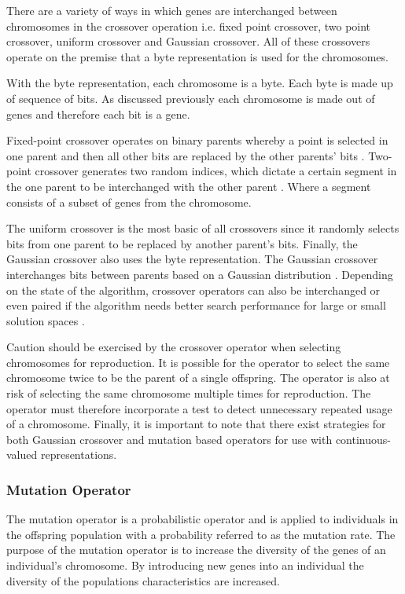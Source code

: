 There are a variety of ways in which genes are interchanged between chromosomes in the crossover operation i.e. fixed point crossover, two point crossover, uniform crossover and Gaussian crossover\cite{CompuIntelligenceIntro}. All of these crossovers operate on the premise that a byte representation is used for the chromosomes. 

With the byte representation, each chromosome is a byte. Each byte is made up of sequence of bits. As discussed previously each chromosome is made out of genes and therefore each bit is a gene\cite{CompuIntelligenceIntro}.

Fixed-point crossover operates on binary parents whereby a point is selected in one parent and then all other bits are replaced by the other parents' bits \cite{HumanPassiveGA}. Two-point crossover generates two random indices, which dictate a certain segment in the one parent to be interchanged with the other parent \cite{ConstrainedGA}. Where a segment consists of a subset of genes from the chromosome. 

The uniform crossover is the most basic of all crossovers since it randomly selects bits from one parent to be replaced by another parent's bits\cite{ParallelGASA,GeostatisticalGA}. Finally, the Gaussian crossover also uses the byte representation. The Gaussian crossover interchanges bits between parents based on a Gaussian distribution \cite{ParallelGASA,GeostatisticalGA}. Depending on the state of the algorithm, crossover operators can also be interchanged or even paired if the algorithm needs better search performance for large or small solution spaces \cite{HetergeneousGA,ParallelGASA}.

Caution should be exercised by the crossover operator when selecting chromosomes for reproduction. It is possible for the operator to select the same chromosome twice to be the parent of a single offspring\cite{CompuIntelligenceIntro}. The operator is also at risk of selecting the same chromosome multiple times for reproduction\cite{CompuIntelligenceIntro}. The operator must therefore incorporate a test to detect unnecessary repeated usage of a chromosome\cite{CompuIntelligenceIntro}. Finally, it is important to note that there exist strategies for both Gaussian crossover and mutation based operators for use with continuous-valued representations\cite{FundamentalSwarm}.

\subsubsection{Mutation Operator}
The mutation operator is a probabilistic operator and is applied to individuals in the offspring population with a probability referred to as the mutation rate\cite{CompuIntelligenceIntro}. The purpose of the mutation operator is to increase the diversity of the genes of an individual's chromosome\cite{CompuIntelligenceIntro}. By introducing new genes into an individual the diversity of the populations characteristics are increased\cite{CoactiveFuzzyGA,AcceleratingGA,ConstrainedGA}.

